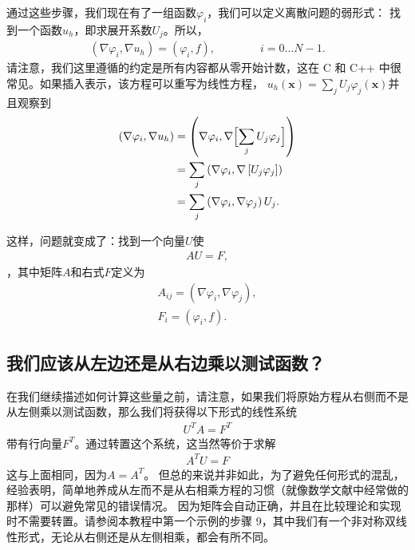 \documentclass{ctexart}
\begin{document}
通过这些步骤，我们现在有了一组函数\(\varphi_i\)，我们可以定义离散问题的弱形式：
找到一个函数\(u_h\)，即求展开系数$U_j$。所以，
\begin{align*}
    (\nabla\varphi_i, \nabla u_h)
     = (\varphi_i, f),
     \qquad\qquad
     i=0\ldots N-1.
\end{align*}
请注意，我们这里遵循的约定是所有内容都从零开始计数，这在 C 和 C++ 中很常见。如果插入表示，该方程可以重写为线性方程，
\(u_h(\mathbf x)=\sum_j U_j\varphi_j(\mathbf x)\)并且观察到
\begin{align*}
    (\nabla\varphi_i, \nabla u_h)
    &= \left(\nabla\varphi_i, \nabla \Bigl[\sum_j U_j \varphi_j\Bigr]\right)
  \\
    &= \sum_j \left(\nabla\varphi_i, \nabla \left[U_j \varphi_j\right]\right)
  \\
    &= \sum_j \left(\nabla\varphi_i, \nabla \varphi_j \right) U_j.
\end{align*}

这样，问题就变成了：找到一个向量$U$使
\begin{align*}
    A U = F,
\end{align*}
，其中矩阵$A$和右式$F$定义为
\begin{align*}
    A_{ij} = (\nabla\varphi_i, \nabla \varphi_j),
    \\
    F_i = (\varphi_i, f).
\end{align*}

\subsection{我们应该从左边还是从右边乘以测试函数？}
在我们继续描述如何计算这些量之前，请注意，如果我们将原始方程从右侧而不是从左侧乘以测试函数，那么我们将获得以下形式的线性系统
\begin{align*}
    U^T A = F^T
\end{align*}
带有行向量\(F^T\)。通过转置这个系统，这当然等价于求解
\begin{align*}
    A^T U = F
\end{align*}
这与上面相同，因为\(A=A^T\)。
但总的来说并非如此，为了避免任何形式的混乱，经验表明，简单地养成从左而不是从右相乘方程的习惯（就像数学文献中经常做的那样）可以避免常见的错误情况。
因为矩阵会自动正确，并且在比较理论和实现时不需要转置。请参阅本教程中第一个示例的步骤 9，其中我们有一个非对称双线性形式，无论从右侧还是从左侧相乘，都会有所不同。
\end{document}
